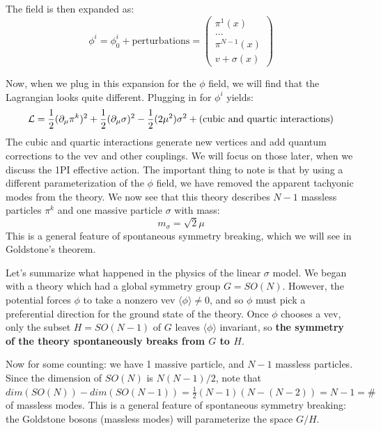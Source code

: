 \documentclass[11pt, oneside]{article}   	%
\theoremstyle{definition}
\numberwithin{equation}{subsection}		%
\begin{document}
The field is then expanded as:
\begin{equation}
	\phi^i = \phi_0^i + \mathrm{perturbations} = \begin{pmatrix} \pi^1(x) \\ ... \\ \pi^{N - 1}(x) \\ v + \sigma(x)\end{pmatrix}
\end{equation}

Now, when we plug in this expansion for the $\phi$ field, we will find that the Lagrangian looks quite different. Plugging in 
for $\phi^i$ yields:
\begin{equation}
	\mathcal L = \frac{1}{2} (\partial_\mu\pi^k)^2 + \frac{1}{2}(\partial_\mu\sigma)^2 - \frac{1}{2} (2\mu^2)\sigma^2 + 
	(\textnormal{cubic and quartic interactions})
\end{equation}
The cubic and quartic interactions generate new vertices and add quantum corrections to the vev and other couplings. We will 
focus on those later, when we discuss the 1PI effective action. The important thing to note is that by using a different 
parameterization of the $\phi$ field, we have removed the apparent tachyonic modes from the theory. We now see that this 
theory describes $N - 1$ massless particles $\pi^k$ and one massive particle $\sigma$ with mass:
\begin{equation}
	m_\sigma = \sqrt{2}\mu
\end{equation}
This is a general feature of spontaneous symmetry breaking, which we will see in Goldstone's theorem. 

Let's summarize what happened in the physics of the linear $\sigma$ model. We began with a theory which had a global 
symmetry group $G = SO(N)$. However, the potential forces $\phi$ to take a nonzero vev $\langle\phi\rangle\neq 0$, and 
so $\phi$ must pick a preferential direction for the ground state of the theory. Once $\phi$ chooses a vev, only the subset $H = 
SO(N - 1)$ of $G$ leaves $\langle\phi\rangle$ invariant, so \textbf{the symmetry of the theory spontaneously breaks from $G$ 
to $H$}. 

Now for some counting: we have 1 massive particle, and $N - 1$ massless particles. Since the dimension of $SO(N)$ is 
$N(N - 1) / 2$, note that $dim(SO(N)) - dim(SO(N - 1)) = \frac{1}{2}(N - 1)(N - (N - 2)) = N - 1 = \#$ of massless modes.
This is a general feature of spontaneous symmetry breaking: the Goldstone bosons (massless modes) will parameterize the 
space $G / H$. 
\end{document}

